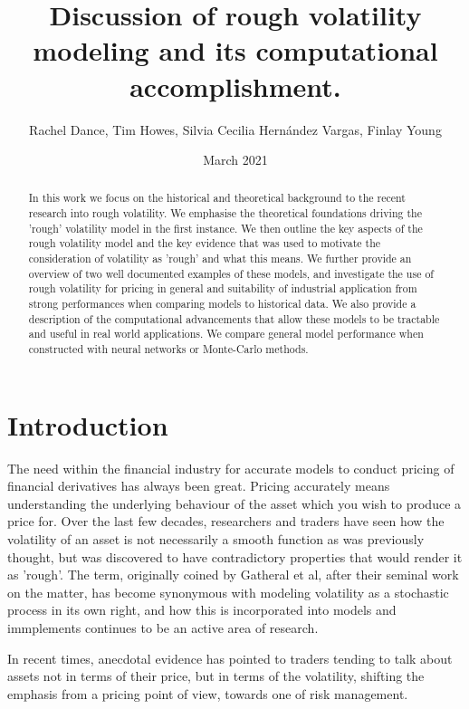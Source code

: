 \documentclass[12pt,oneside]{article}
\title{Discussion of rough volatility modeling and its computational accomplishment.}
\date{ March 2021 }
\author{Rachel Dance, Tim Howes, Silvia Cecilia Hernández Vargas, Finlay Young}
\begin{document}
  \maketitle

  \begin{abstract}In this work we focus on the historical and theoretical background to the recent research into rough volatility. We emphasise the theoretical foundations driving the 'rough' volatility model in the first instance. We then outline the key aspects of the rough volatility model and the key evidence that was used to motivate the consideration of volatility as 'rough' and what this means. We further provide an overview of two well documented examples of these models, and investigate the use of rough volatility for pricing in general and suitability of industrial application from strong performances when comparing models to historical data. We also provide a description of the computational advancements that allow these models to be tractable and useful in real world applications. We compare general model performance when constructed with neural networks or Monte-Carlo methods.
  \end{abstract}

  \tableofcontents
 \newpage

\section{Introduction}
The need within the financial industry for accurate models to conduct pricing of financial derivatives has always been great. Pricing accurately means understanding the underlying behaviour of the asset which you wish to produce a price for. Over the last few decades, researchers and traders have seen how the volatility of an asset is not necessarily a smooth function as was previously thought, but was discovered to have contradictory properties that would render it as 'rough'. The term, originally coined by Gatheral et al, after their seminal work on the matter, has become synonymous with modeling volatility as a stochastic process in its own right, and how this is incorporated into models and immplements continues to be an active area of research. 

In recent times, anecdotal evidence has pointed to traders tending to talk about assets not in terms of their price, but in terms of the volatility, shifting the emphasis from a pricing point of view, towards one of risk management. 
\end{document}
